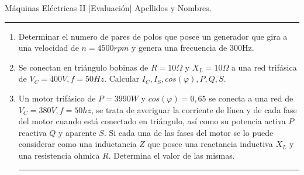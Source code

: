 \documentclass[./eval.tex]{subfiles}
\newcommand{\head}{\noindent Máquinas Eléctricas II |Evaluación| Apellidos y Nombres.
\rule{10cm}{0.1mm}}
\newcommand{\separador}{\noindent\rule{\paperwidth}{0.1mm}\newline}
\begin{document}
\head

 \begin{enumerate}
 
 \item Determinar el numero de pares de polos que posee un generador que gira a una velocidad de $n=4500rpm$ y genera una frecuencia de 300Hz.

    \item Se conectan en triángulo bobinas de $R=10\Omega$ y $X_L=10\Omega$ a una red trifásica de $V_C=400V, f=50Hz$. Calcular $I_C,I_S, cos(\varphi), P,Q,S$.
 

    \item Un motor trifásico de $P=3990W$ y $cos(\varphi)=0,65$ se conecta a una red de $V_C=380V, f=50hz$, se trata de averiguar la corriente de línea y de cada fase del motor cuando está conectado en triángulo, así como su potencia activa $P$ reactiva $Q$ y aparente $S$. Si cada una de las fases del motor se lo puede considerar como una inductancia $Z$ que posee una reactancia inductiva $X_L$ y una resistencia ohmica $R$. Determina el valor de las mismas.
   
    \separador
\end{enumerate}
\end{document}
